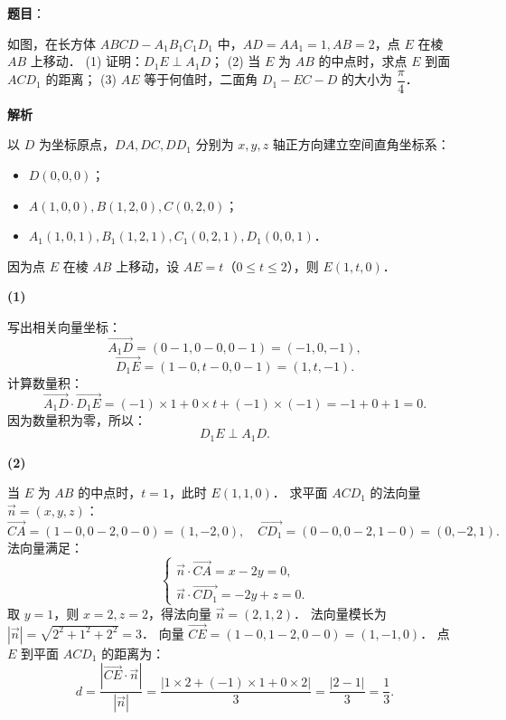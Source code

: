 \begin{answer}

\textbf{题目}：

如图，在长方体 $ABCD - A_1B_1C_1D_1$ 中，$AD = AA_1 = 1, AB = 2$，点 $E$ 在棱 $AB$ 上移动．
(1) 证明：$D_1E \perp A_1D$；
(2) 当 $E$ 为 $AB$ 的中点时，求点 $E$ 到面 $ACD_1$ 的距离；
(3) $AE$ 等于何值时，二面角 $D_1 - EC - D$ 的大小为 $\dfrac{\pi}{4}$．
\nopagebreak[4]
\begin{center}\end{center}
\nopagebreak[4]
\textbf{解析}

以 $D$ 为坐标原点，$DA, DC, DD_1$ 分别为 $x, y, z$ 轴正方向建立空间直角坐标系：
\begin{itemize}
\item $D(0, 0, 0)$；
\item $A(1, 0, 0), B(1, 2, 0), C(0, 2, 0)$；
\item $A_1(1, 0, 1), B_1(1, 2, 1), C_1(0, 2, 1), D_1(0, 0, 1)$．
\end{itemize}

因为点 $E$ 在棱 $AB$ 上移动，设 $AE = t$（$0 \leqslant t \leqslant 2$），则 $E(1, t, 0)$．

\textbf{(1)}

写出相关向量坐标：
\nopagebreak[4]
\[
\vec{A_1D} = (0 - 1, 0 - 0, 0 - 1) = (-1, 0, -1),
\]
\nopagebreak[4]
\[
\vec{D_1E} = (1 - 0, t - 0, 0 - 1) = (1, t, -1).
\]
计算数量积：
\nopagebreak[4]
\[
\vec{A_1D} \cdot \vec{D_1E} = (-1) \times 1 + 0 \times t + (-1) \times (-1) = -1 + 0 + 1 = 0.
\]
因为数量积为零，所以：
\nopagebreak[4]
\[
D_1E \perp A_1D.
\]

\textbf{(2)}

当 $E$ 为 $AB$ 的中点时，$t = 1$，此时 $E(1, 1, 0)$．
求平面 $ACD_1$ 的法向量 $\vec{n} = (x, y, z)$：
\nopagebreak[4]
\[
\vec{CA} = (1 - 0, 0 - 2, 0 - 0) = (1, -2, 0), \quad \vec{CD_1} = (0 - 0, 0 - 2, 1 - 0) = (0, -2, 1).
\]
法向量满足：
\nopagebreak[4]
\[
\begin{cases}
\vec{n} \cdot \vec{CA} = x - 2y = 0, \\
\vec{n} \cdot \vec{CD_1} = -2y + z = 0.
\end{cases}
\]
取 $y = 1$，则 $x = 2, z = 2$，得法向量 $\vec{n} = (2, 1, 2)$．
法向量模长为 $|\vec{n}| = \sqrt{2^2 + 1^2 + 2^2} = 3$．
向量 $\vec{CE} = (1 - 0, 1 - 2, 0 - 0) = (1, -1, 0)$．
点 $E$ 到平面 $ACD_1$ 的距离为：
\nopagebreak[4]
\[
d = \dfrac{|\vec{CE} \cdot \vec{n}|}{|\vec{n}|} = \dfrac{|1 \times 2 + (-1) \times 1 + 0 \times 2|}{3} = \dfrac{|2 - 1|}{3} = \dfrac{1}{3}.
\]


\end{answer}
